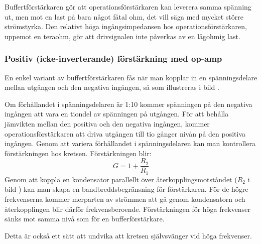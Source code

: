 Buffertförstärkaren gör att operationsförstärkaren kan leverera samma spänning
ut, men mot en last på bara något fåtal ohm, det vill säga med mycket större
strömstyrka.
Den relativt höga ingångsimpedansen hos operationsförstärkaren, uppemot en
teraohm, gör att drivsignalen inte påverkas av en lågohmig last.

\subsubsection{Positiv (icke-inverterande) förstärkning med op-amp}
\label{icke-inverterande förstärkning}

En enkel variant av buffertförstärkaren fås när man kopplar in en
spänningsdelare mellan utgången och den negativa ingången, så som illustreras i
bild .


Om förhållandet i spänningsdelaren är 1:10 kommer spänningen på den negativa
ingången att vara en tiondel av spänningen på utgången.
För att behålla jämvikten mellan den positiva och den negativa ingången, kommer
operationsförstärkaren att driva utgången till tio gånger nivån på den positiva
ingången.
Genom att variera förhållandet i spänningsdelaren kan man kontrollera
förstärkningen hos kretsen.
Förstärkningen blir:
\[G = 1+ \dfrac{R_2}{R_1}\]
Genom att koppla en kondensator parallellt över återkopplingsmotståndet
(\(R_2\) i bild ) kan man skapa en bandbreddsbegränsning
för förstärkaren.
För de högre frekvenserna kommer merparten av strömmen att gå genom
kondensatorn och återkopplingen blir därför frekvensberoende.
Förstärkningen för höga frekvenser sänks mot samma nivå som för en
bufferförstärkare.

Detta är också ett sätt att undvika att kretsen självsvänger vid höga
frekvenser.

